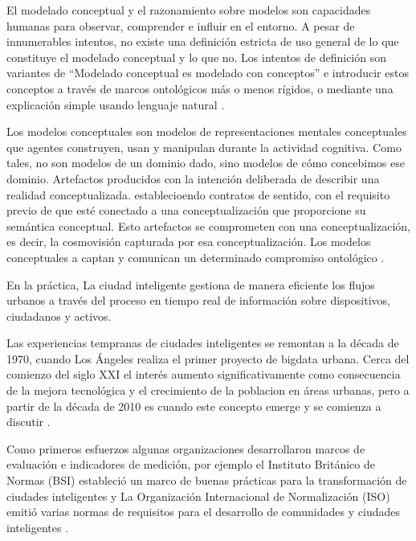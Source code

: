\documentclass[runningheads,a4paper,spanish]{llncs}
\begin{document}
El modelado conceptual y el razonamiento sobre modelos son capacidades humanas
para observar, comprender e influir en el entorno. A pesar de innumerables
intentos, no existe una definición estricta de uso general de lo que constituye
el modelado conceptual y lo que no.  Los intentos de definición son variantes de
“Modelado conceptual es modelado con conceptos” e introducir estos conceptos a
través de marcos ontológicos más o menos rígidos, o mediante una explicación
simple usando lenguaje natural \cite{Mawr2020}.

Los modelos conceptuales son modelos de representaciones mentales conceptuales
que agentes construyen, usan y manipulan durante la actividad cognitiva.  Como
tales, no son modelos de un dominio dado, sino modelos de cómo concebimos ese
dominio. Artefactos producidos con la intención deliberada de describir una
realidad conceptualizada. establecioendo contratos de sentido, con el requisito
previo de que esté conectado a una conceptualización que proporcione su
semántica conceptual. Esto artefactos se comprometen con una conceptualización,
es decir, la cosmovisión capturada por esa conceptualización. Los modelos
conceptuales a captan y comunican un determinado compromiso ontológico
\cite{Guarino2020}.

En la práctica,
La ciudad inteligente
gestiona de manera eficiente los flujos urbanos
a través del proceso en tiempo real de información
sobre dispositivos, ciudadanos y activos. 

Las experiencias tempranas de ciudades inteligentes se remontan a la década de
1970, cuando Los Ángeles realiza el primer proyecto de bigdata urbana.  Cerca
del comienzo del siglo XXI el interés aumento significativamente como
consecuencia de la mejora tecnológica y el crecimiento de la poblacion en áreas
urbanas, pero a partir de la década de 2010 es cuando este concepto emerge y se
comienza a discutir \cite{stubinger_understanding_2020}.

Como primeros esfuerzos 
algunas organizaciones 
desarrollaron marcos de evaluación e indicadores de medición,
por ejemplo
el Instituto Británico de Normas
(BSI) estableció
un marco de buenas prácticas para la
transformación de ciudades inteligentes
y
La Organización Internacional de Normalización (ISO) emitió
varias normas de requisitos para el desarrollo de comunidades y
ciudades inteligentes
\cite{aljowder_systematic_2019}.
\end{document}
